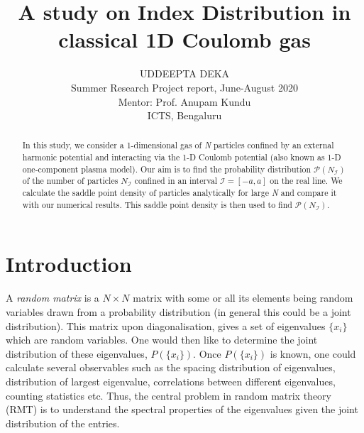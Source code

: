 \documentclass[11pt]{article}
\begin{document}
\title{A study on Index Distribution in classical 1D Coulomb gas}
\author{UDDEEPTA DEKA\\
\small Summer Research Project report, June-August 2020\\
\small Mentor: Prof. Anupam Kundu\\
\small ICTS, Bengaluru	}
\date{} %
\maketitle
\pagestyle{myheadings}
\thispagestyle{empty}
\begin{abstract}
\noindent

In this study, we consider a 1-dimensional gas of \textit{N} particles confined by an external harmonic potential and interacting via the 1-D Coulomb potential (also known as 1-D one-component plasma model). Our aim is to find the probability distribution $\mathcal{P}(N_\mathcal{I})$ of the number of particles $N_\mathcal{I}$ confined in an interval $\mathcal{I} = [-a,a]$ on the real line. We calculate the saddle point density of particles analytically for large \textit{N} and compare it with our numerical results. This saddle point density is then used to find $\mathcal{P}(N_\mathcal{I})$.

\vspace{0.6 cm}
\end{abstract}

\tableofcontents

\section{Introduction}
A \textit{random matrix} is a $N\times N$ matrix with some or all its elements being random variables drawn from a probability distribution (in general this could be a joint distribution). This matrix upon diagonalisation, gives a set of eigenvalues $\{x_i\}$ which are random variables. One would then like to determine the joint distribution of these eigenvalues, $P(\{x_i\})$. Once $P(\{x_i\})$ is known, one could calculate several observables such as the spacing distribution of eigenvalues, distribution of largest eigenvalue, correlations between different eigenvalues, counting statistics etc. Thus, the central problem in random matrix theory (RMT) is to understand the spectral properties of the eigenvalues given the joint distribution of the entries.
\end{document}
